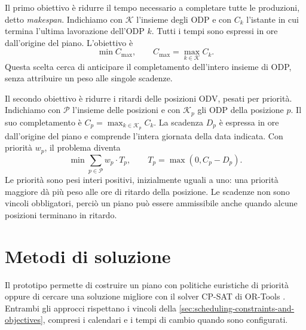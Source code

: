 Il primo obiettivo è ridurre il tempo necessario a completare tutte le produzioni, detto \emph{makespan}. Indichiamo con $\mathcal{K}$ l'insieme degli ODP e con $C_k$ l'istante in cui termina l'ultima lavorazione dell'ODP $k$. Tutti i tempi sono espressi in ore dall'origine del piano. L'obiettivo è
\begin{equation}
\label{eq:scheduling-makespan}
\min C_{\max}, \qquad C_{\max}=\max_{k\in\mathcal{K}} C_k.
\end{equation}
Questa scelta cerca di anticipare il completamento dell'intero insieme di ODP, senza attribuire un peso alle singole scadenze.

Il secondo obiettivo è ridurre i ritardi delle posizioni ODV, pesati per priorità. Indichiamo con $\mathcal{P}$ l'insieme delle posizioni e con $\mathcal{K}_p$ gli ODP della posizione $p$. Il suo completamento è $C_p=\max_{k\in\mathcal{K}_p}C_k$. La scadenza $D_p$ è espressa in ore dall'origine del piano e comprende l'intera giornata della data indicata. Con priorità $w_p$, il problema diventa
\begin{equation}
\label{eq:scheduling-weighted-tardiness}
\min\sum_{p\in\mathcal{P}} w_p\cdot T_p,
\qquad T_p=\max(0,C_p-D_p).
\end{equation}
Le priorità sono pesi interi positivi, inizialmente uguali a uno: una priorità maggiore dà più peso alle ore di ritardo della posizione. Le scadenze non sono vincoli obbligatori, perciò un piano può essere ammissibile anche quando alcune posizioni terminano in ritardo.

\section{Metodi di soluzione}
\label{sec:scheduling-solution-methods}

Il prototipo permette di costruire un piano con politiche euristiche di priorità oppure di cercare una soluzione migliore con il solver CP-SAT di OR-Tools \parencite{google2024cpsat}. Entrambi gli approcci rispettano i vincoli della \cref{sec:scheduling-constraints-and-objectives}, compresi i calendari e i tempi di cambio quando sono configurati.


